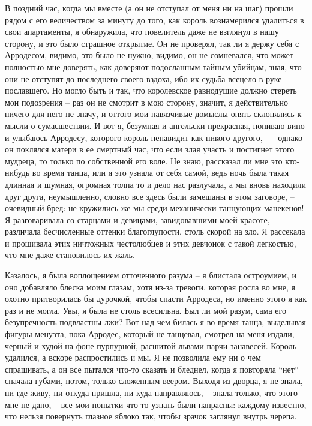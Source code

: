 В поздний час, когда  мы вместе (а он не отступал от меня  ни на шаг) прошли
рядом с его величеством за минуту до того, как король вознамерился удалиться
в свои  апартаменты, я обнаружила,  что повелитель  даже не взглянул  в нашу
сторону, и это было страшное открытие. Он не проверял, так ли я держу себя с
Арродесом, видимо,  это было не нужно,  видимо, он не сомневался,  что может
полностью мне доверять,  как доверяют подосланным тайным  убийцам, зная, что
они не  отступят до последнего своего  вздоха, ибо их судьба  всецело в руке
пославшего. Но могло  быть и так, что королевское  равнодушие должно стереть
мои подозрения --  раз он не смотрит в мою  сторону, значит, я действительно
ничего для него не значу, и оттого мои навязчивые домыслы опять склонялись к
мысли о сумасшествии. И вот я, безумная и ангельски прекрасная, попиваю вино
и  улыбаюсь Арродесу,  которого король  ненавидит как  никого другого,  - --
однако  он  поклялся матери  в  ее  смертный час,  что  если  злая участь  и
постигнет  этого  мудреца, то  только  по  собственной  его воле.  Не  знаю,
рассказал ли  мне это кто-нибудь  во время танца, или  я это узнала  от себя
самой, ведь ночь была  такая длинная и шумная, огромная толпа  то и дело нас
разлучала, а  мы вновь  находили друг друга,  неумышленно, словно  все здесь
были замешаны в  этом заговоре, -- очевидный бред: не  кружились же мы среди
механически  танцующих манекенов!  Я разговаривала  со старцами  и девицами,
завидовавшими  моей красоте,  различала бесчисленные  оттенки благоглупости,
столь скорой  на зло. Я рассекала  и прошивала этих ничтожных  честолюбцев и
этих девчонок с такой легкостью, что мне даже становилось их жаль.

Казалось, я была воплощением отточенного  разума -- я блистала остроумием, и
оно добавляло блеска моим глазам, хотя  из-за тревоги, которая росла во мне,
я охотно притворилась бы дурочкой, чтобы  спасти Арродеса, но именно этого я
как раз и не  могла. Увы, я была не столь всесильна. Был  ли мой разум, сама
его  безупречность подвластны  лжи? Вот  над чем  билась я  во время  танца,
выделывая фигуры менуэта, пока Арродес, который не танцевал, смотрел на меня
издали, черный и  худой на фоне пурпурной, расшитой  львами парчи занавесей.
Король удалился, а  вскоре распростились и мы.  Я не позволила ему  ни о чем
спрашивать, а  он все пытался  что-то сказать  и бледнел, когда  я повторяла
``нет'' сначала губами, потом, только  сложенным веером. Выходя из дворца, я
не  знала, ни  где живу,  ни откуда  пришла, ни  куда направляюсь,  -- знала
только,  что этого  мне  не дано,  --  все мои  попытки  что-то узнать  были
напрасны: каждому известно,  что нельзя повернуть глазное  яблоко так, чтобы
зрачок заглянул внутрь черепа.

